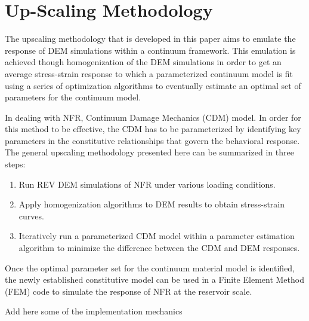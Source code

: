 \section{Up-Scaling Methodology}
The upscaling methodology that is developed in this paper aims to emulate the response of DEM simulations within a continuum framework. This emulation is achieved though homogenization of the DEM simulations in order to get an average stress-strain response to which a parameterized continuum model is fit using a series of optimization algorithms to eventually estimate an optimal set of parameters for the continuum model.

In dealing with NFR, Continuum Damage Mechanics (CDM) model. In order for this method to be effective, the CDM has to be parameterized by identifying key parameters in the constitutive relationships that govern the behavioral response. The general upscaling methodology presented here can be summarized in three steps:
\begin{enumerate}
	\item Run REV DEM simulations of NFR under various loading conditions.
	\item Apply homogenization algorithms to DEM results to obtain stress-strain curves.
	\item Iteratively run a parameterized CDM model within a parameter estimation algorithm to minimize the difference between the CDM and DEM responses.
\end{enumerate}
Once the optimal parameter set for the continuum material model is identified, the newly established constitutive model can be used in a Finite Element Method (FEM) code to simulate the response of NFR at the reservoir scale.

Add here some of the implementation mechanics